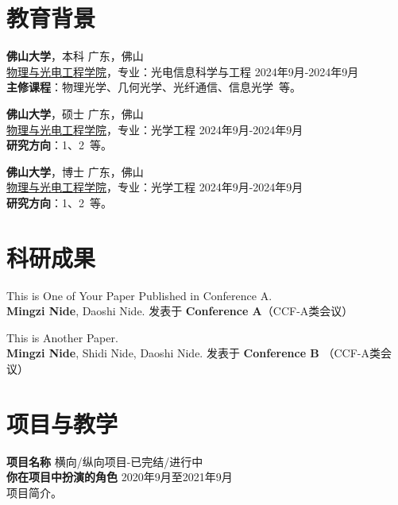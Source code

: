 \section{\makebox[\widthof{\faGraduationCap}][c]{\color{FOSU_Red}{\faGraduationCap}}\quad 教育背景}
\vspace{0.5em}
{\large \textbf{佛山大学}}，本科 \hfill {广东，佛山} \\
{{\href{https://www.fosu.edu.cn/spoe/}{物理与光电工程学院}}}，专业：光电信息科学与工程 \hfill {2024年9月-2024年9月} \\
\textbf{主修课程}：物理光学、几何光学、光纤通信、信息光学\ 等。


\vspace{0.5em}
{\large \textbf{佛山大学}}，硕士 \hfill {广东，佛山} \\
{{\href{https://www.fosu.edu.cn/spoe/}{物理与光电工程学院}}}，专业：光学工程 \hfill {2024年9月-2024年9月} \\
\textbf{研究方向}：1、2\ 等。

\vspace{0.5em}
{\large \textbf{佛山大学}}，博士 \hfill {广东，佛山} \\
{{\href{https://www.fosu.edu.cn/spoe/}{物理与光电工程学院}}}，专业：光学工程 \hfill {2024年9月-2024年9月} \\
\textbf{研究方向}：1、2\ 等。


\section{\makebox[\widthof{\faGraduationCap}][c]{\color{FOSU_Red}{\faGraduationCap}}\quad 科研成果}
\vspace{0.5em}
This is One of Your Paper Published in Conference A. \\
\textbf{Mingzi Nide}, Daoshi Nide. \hfill 发表于 \textbf{Conference A}（CCF-A类会议）

\vspace{0.5em}
This is Another Paper. \\
\textbf{Mingzi Nide}, Shidi Nide, Daoshi Nide. \hfill 发表于 \textbf{Conference B} （CCF-A类会议）


\section{\makebox[\widthof{\faChalkboardTeacher}][c]{\color{FOSU_Red}{\faChalkboardTeacher}}\quad 项目与教学}
\vspace{0.5em}
{\large{\textbf{项目名称}}} \hfill {横向/纵向项目-已完结/进行中}\\
\textbf{你在项目中扮演的角色} \hfill 2020年9月至2021年9月\\
项目简介。

